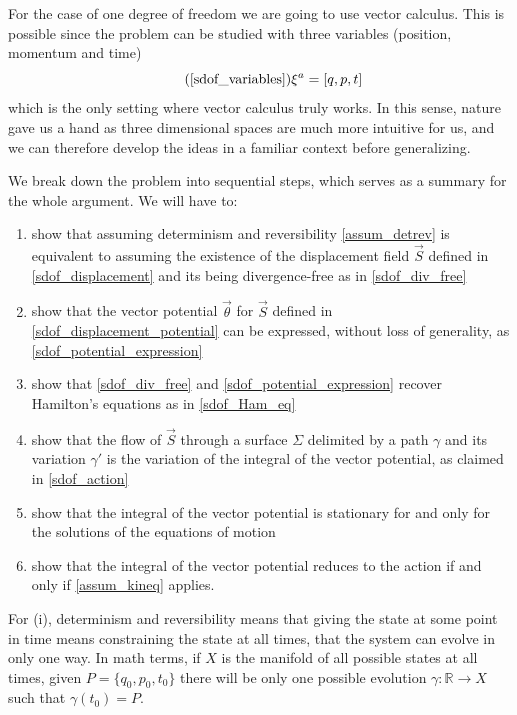 \documentclass[fleqn,10pt]{wlscirep}
\begin{document}
For the case of one degree of freedom we are going to use vector calculus. This is possible since the problem can be studied with three variables (position, momentum and time)
\begin{equation}
\tag*{(\ref{sdof_variables})}
	\xi^a = [ q, p, t]
\end{equation}
which is the only setting where vector calculus truly works. In this sense, nature gave us a hand as three dimensional spaces are much more intuitive for us, and we can therefore develop the ideas in a familiar context before generalizing.

We break down the problem into sequential steps, which serves as a summary for the whole argument. We will have to:
\begin{enumerate}[label=(\roman*)]
	\item show that assuming determinism and reversibility \ref{assum_detrev} is equivalent to assuming the existence of the displacement field $\vec{S}$ defined in \ref{sdof_displacement} and its being divergence-free as in \ref{sdof_div_free}
	\item show that the vector potential $\vec{\theta}$ for $\vec{S}$ defined in \ref{sdof_displacement_potential} can be expressed, without loss of generality, as \ref{sdof_potential_expression}
	\item show that \ref{sdof_div_free} and \ref{sdof_potential_expression} recover Hamilton's equations as in \ref{sdof_Ham_eq}
	\item show that the flow of $\vec{S}$ through a surface $\Sigma$ delimited by a path $\gamma$ and its variation $\gamma'$ is the variation of the integral of the vector potential, as claimed in \ref{sdof_action}
	\item show that the integral of the vector potential is stationary for and only for the solutions of the equations of motion
	\item show that the integral of the vector potential reduces to the action if and only if \ref{assum_kineq} applies.
\end{enumerate}

For (i), determinism and reversibility means that giving the state at some point in time means constraining the state at all times, that the system can evolve in only one way. In math terms, if $X$ is the manifold of all possible states at all times, given $P = \{q_0, p_0, t_0\}$ there will be only one possible evolution $\gamma : \mathbb{R} \to X$ such that $\gamma(t_0) = P$.
\end{document}
